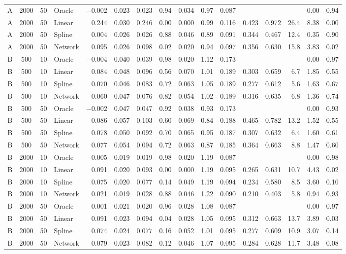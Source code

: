 \documentclass[11pt,a4paper]{article}
\begin{document}
\begin{landscape}
\begin{center}
\begin{tabular}{cccl rrr rr r r rr r r r}
A & 2000 & 50 & Oracle & $-0.002$ & 0.023 & 0.023 & 0.94 & 0.034 & 0.97 & 0.087 &  &  &  & 0.00 & 0.94\\
A & 2000 & 50 & Linear & 0.244 & 0.030 & 0.246 & 0.00 & 0.000 & 0.99 & 0.116 & 0.423 & 0.972 & 26.4 & 8.38 & 0.00\\
A & 2000 & 50 & Spline & 0.004 & 0.026 & 0.026 & 0.88 & 0.046 & 0.89 & 0.091 & 0.344 & 0.467 & 12.4 & 0.35 & 0.90\\
A & 2000 & 50 & Network & 0.095 & 0.026 & 0.098 & 0.02 & 0.020 & 0.94 & 0.097 & 0.356 & 0.630 & 15.8 & 3.83 & 0.02\\
B & 500 & 10 & Oracle & $-0.004$ & 0.040 & 0.039 & 0.98 & 0.020 & 1.12 & 0.173 &  &  &  & 0.00 & 0.97\\
B & 500 & 10 & Linear & 0.084 & 0.048 & 0.096 & 0.56 & 0.070 & 1.01 & 0.189 & 0.303 & 0.659 & 6.7 & 1.85 & 0.55\\
B & 500 & 10 & Spline & 0.070 & 0.046 & 0.083 & 0.72 & 0.063 & 1.05 & 0.189 & 0.277 & 0.612 & 5.6 & 1.63 & 0.67\\
B & 500 & 10 & Network & 0.060 & 0.047 & 0.076 & 0.82 & 0.054 & 1.02 & 0.189 & 0.316 & 0.635 & 6.8 & 1.36 & 0.74\\
B & 500 & 50 & Oracle & $-0.002$ & 0.047 & 0.047 & 0.92 & 0.038 & 0.93 & 0.173 &  &  &  & 0.00 & 0.93\\
B & 500 & 50 & Linear & 0.086 & 0.057 & 0.103 & 0.60 & 0.069 & 0.84 & 0.188 & 0.465 & 0.782 & 13.2 & 1.52 & 0.55\\
B & 500 & 50 & Spline & 0.078 & 0.050 & 0.092 & 0.70 & 0.065 & 0.95 & 0.187 & 0.307 & 0.632 & 6.4 & 1.60 & 0.61\\
B & 500 & 50 & Network & 0.077 & 0.054 & 0.094 & 0.72 & 0.063 & 0.87 & 0.185 & 0.364 & 0.663 & 8.8 & 1.47 & 0.60\\
B & 2000 & 10 & Oracle & 0.005 & 0.019 & 0.019 & 0.98 & 0.020 & 1.19 & 0.087 &  &  &  & 0.00 & 0.98\\
B & 2000 & 10 & Linear & 0.091 & 0.020 & 0.093 & 0.00 & 0.000 & 1.19 & 0.095 & 0.265 & 0.631 & 10.7 & 4.43 & 0.02\\
B & 2000 & 10 & Spline & 0.075 & 0.020 & 0.077 & 0.14 & 0.049 & 1.19 & 0.094 & 0.234 & 0.580 & 8.5 & 3.60 & 0.10\\
B & 2000 & 10 & Network & 0.021 & 0.019 & 0.028 & 0.88 & 0.046 & 1.22 & 0.090 & 0.210 & 0.403 & 5.8 & 0.94 & 0.93\\
B & 2000 & 50 & Oracle & 0.001 & 0.021 & 0.020 & 0.96 & 0.028 & 1.08 & 0.087 &  &  &  & 0.00 & 0.97\\
B & 2000 & 50 & Linear & 0.091 & 0.023 & 0.094 & 0.04 & 0.028 & 1.05 & 0.095 & 0.312 & 0.663 & 13.7 & 3.89 & 0.03\\
B & 2000 & 50 & Spline & 0.074 & 0.024 & 0.077 & 0.16 & 0.052 & 1.01 & 0.095 & 0.277 & 0.609 & 10.9 & 3.07 & 0.14\\
B & 2000 & 50 & Network & 0.079 & 0.023 & 0.082 & 0.12 & 0.046 & 1.07 & 0.095 & 0.284 & 0.628 & 11.7 & 3.48 & 0.08\\
\bottomrule
\end{tabular}
\end{center}
\end{landscape}
\end{document}
